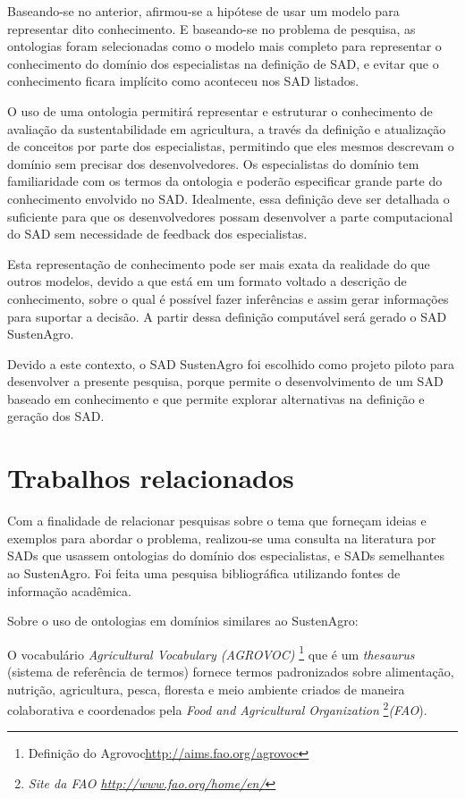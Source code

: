 Baseando-se no anterior, afirmou-se a hipótese de usar um modelo para
representar dito conhecimento. E baseando-se no problema de pesquisa,
as ontologias foram selecionadas como o modelo mais completo para
representar o conhecimento do domínio dos especialistas na definição
de SAD, e evitar que o conhecimento ficara implícito como aconteceu
nos SAD listados.

O uso de uma ontologia permitirá representar e estruturar o conhecimento
de avaliação da sustentabilidade em agricultura, a través da definição
e atualização de conceitos por parte dos especialistas, permitindo
que eles mesmos descrevam o domínio sem precisar dos desenvolvedores.
Os especialistas do domínio tem familiaridade com os termos da ontologia
e poderão especificar grande parte do conhecimento envolvido no SAD.
Idealmente, essa definição deve ser detalhada o suficiente para que
os desenvolvedores possam desenvolver a parte computacional do SAD
sem necessidade de \foreignlanguage{english}{feedback} dos especialistas.

Esta representação de conhecimento pode ser mais exata da realidade
do que outros modelos, devido a que está em um formato voltado a descrição
de conhecimento, sobre o qual é possível fazer inferências e assim
gerar informações para suportar a decisão. A partir dessa definição
computável será gerado o SAD SustenAgro. 

Devido a este contexto, o SAD SustenAgro foi escolhido como projeto
piloto para desenvolver a presente pesquisa, porque permite o desenvolvimento
de um SAD baseado em conhecimento e que permite explorar alternativas
na definição e geração dos SAD.

\section{Trabalhos relacionados}

Com a finalidade de relacionar pesquisas sobre o tema que forneçam
ideias e exemplos para abordar o problema, realizou-se uma consulta
na literatura por SADs que usassem ontologias do domínio dos especialistas,
e SADs semelhantes ao SustenAgro. Foi feita uma pesquisa bibliográfica
utilizando fontes de informação acadêmica.

Sobre o uso de ontologias em domínios similares ao SustenAgro:

O vocabulário\emph{ }\foreignlanguage{english}{\emph{Agricultural
Vocabulary (AGROVOC)}}
\footnote{Definição do Agrovoc\url{http://aims.fao.org/agrovoc}}
que é um \foreignlanguage{english}{\emph{thesaurus}} (sistema de referência
de termos) fornece termos padronizados sobre alimentação, nutrição,
agricultura, pesca, floresta e meio ambiente criados de maneira colaborativa
e coordenados pela \foreignlanguage{english}{\emph{Food and Agricultural
Organization}}\emph{ }\footnote{\emph{Site da FAO \url{http://www.fao.org/home/en/}}}\emph{(FAO}). 

